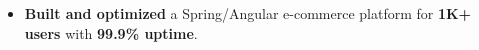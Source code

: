 \begin{itemize}
    \item \textbf{Built and optimized} a Spring/Angular e-commerce platform for \textbf{1K+ users} with \textbf{99.9\% uptime}.
\end{itemize}



    
		



